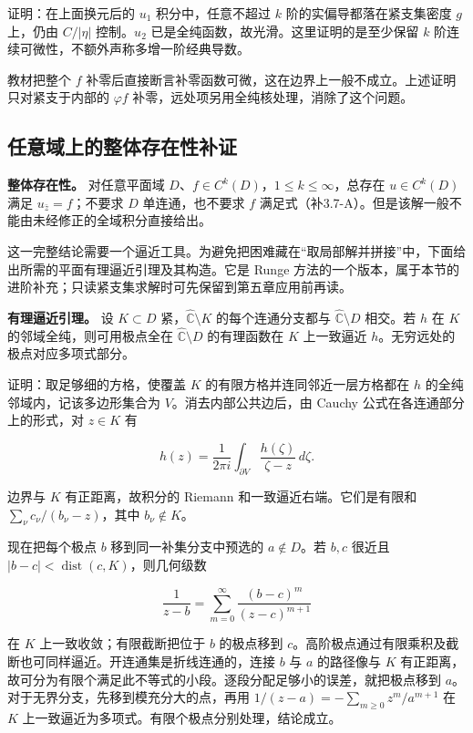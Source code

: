 \documentclass[11pt,a4paper]{article}
\begin{document}
证明：在上面换元后的 \(u_1\) 积分中，任意不超过 \(k\)
阶的实偏导都落在紧支集密度 \(g\) 上，仍由 \(C/|\eta|\) 控制。\(u_2\)
已是全纯函数，故光滑。这里证明的是至少保留 \(k\)
阶连续可微性，不额外声称多增一阶经典导数。

教材把整个 \(f\)
补零后直接断言补零函数可微，这在边界上一般不成立。上述证明只对紧支于内部的
\(\varphi f\) 补零，远处项另用全纯核处理，消除了这个问题。

\subsection{任意域上的整体存在性补证}\label{ch03-s7-ux4efbux610fux57dfux4e0aux7684ux6574ux4f53ux5b58ux5728ux6027ux8865ux8bc1}

\textbf{整体存在性。} 对任意平面域
\(D\)、\(f\in C^k(D)\)，\(1\le k\le\infty\)，总存在 \(u\in C^k(D)\) 满足
\(u_{\bar z}=f\)；不要求 \(D\) 单连通，也不要求 \(f\)
满足式（补3.7-A）。但是该解一般不能由未经修正的全域积分直接给出。

这一完整结论需要一个逼近工具。为避免把困难藏在``取局部解并拼接''中，下面给出所需的平面有理逼近引理及其构造。它是
Runge
方法的一个版本，属于本节的进阶补充；只读紧支集求解时可先保留到第五章应用前再读。

\textbf{有理逼近引理。} 设 \(K\subset D\)
紧，\(\widehat{\mathbb C}\setminus K\) 的每个连通分支都与
\(\widehat{\mathbb C}\setminus D\) 相交。若 \(h\) 在 \(K\)
的邻域全纯，则可用极点全在 \(\widehat{\mathbb C}\setminus D\)
的有理函数在 \(K\) 上一致逼近 \(h\)。无穷远处的极点对应多项式部分。

证明：取足够细的方格，使覆盖 \(K\) 的有限方格并连同邻近一层方格都在
\(h\) 的全纯邻域内，记该多边形集合为 \(V\)。消去内部公共边后，由 Cauchy
公式在各连通部分上的形式，对 \(z\in K\) 有

\[
h(z)=\frac1{2\pi i}\int_{\partial V}\frac{h(\zeta)}{\zeta-z}\,d\zeta.
\]

边界与 \(K\) 有正距离，故积分的 Riemann 和一致逼近右端。它们是有限和
\(\sum_\nu c_\nu/(b_\nu-z)\)，其中 \(b_\nu\notin K\)。

现在把每个极点 \(b\) 移到同一补集分支中预选的 \(a\notin D\)。若 \(b,c\)
很近且 \(|b-c|<\operatorname{dist}(c,K)\)，则几何级数

\[
\frac1{z-b}=\sum_{m=0}^{\infty}\frac{(b-c)^m}{(z-c)^{m+1}}
\]

在 \(K\) 上一致收敛；有限截断把位于 \(b\) 的极点移到
\(c\)。高阶极点通过有限乘积及截断也可同样逼近。开连通集是折线连通的，连接
\(b\) 与 \(a\) 的路径像与 \(K\)
有正距离，故可分为有限个满足此不等式的小段。逐段分配足够小的误差，就把极点移到
\(a\)。对于无界分支，先移到模充分大的点，再用
\(1/(z-a)=-\sum_{m\ge0}z^m/a^{m+1}\) 在 \(K\)
上一致逼近为多项式。有限个极点分别处理，结论成立。
\end{document}
